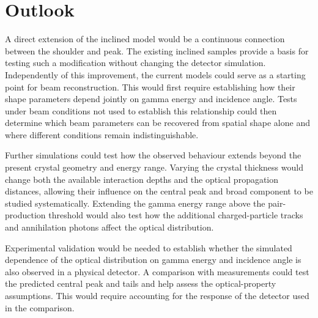 \section{Outlook}

A direct extension of the inclined model would be a continuous connection between the shoulder and peak. The existing inclined samples provide a basis for testing such a modification without changing the detector simulation. Independently of this improvement, the current models could serve as a starting point for beam reconstruction. This would first require establishing how their shape parameters depend jointly on gamma energy and incidence angle. Tests under beam conditions not used to establish this relationship could then determine which beam parameters can be recovered from spatial shape alone and where different conditions remain indistinguishable.

Further simulations could test how the observed behaviour extends beyond the present crystal geometry and energy range. Varying the crystal thickness would change both the available interaction depths and the optical propagation distances, allowing their influence on the central peak and broad component to be studied systematically. Extending the gamma energy range above the pair-production threshold would also test how the additional charged-particle tracks and annihilation photons affect the optical distribution.

Experimental validation would be needed to establish whether the simulated dependence of the optical distribution on gamma energy and incidence angle is also observed in a physical detector. A comparison with measurements could test the predicted central peak and tails and help assess the optical-property assumptions. This would require accounting for the response of the detector used in the comparison.
